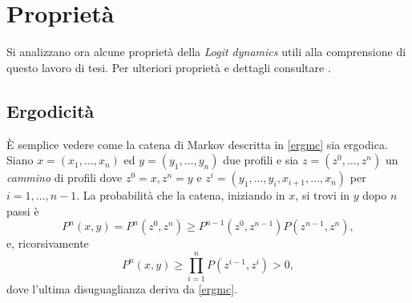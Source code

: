 \section{Proprietà}
Si analizzano ora alcune proprietà della \textit{Logit dynamics} utili alla comprensione di questo lavoro di tesi. Per ulteriori proprietà e dettagli consultare \cite{ferraioli2012logit}.
\subsection{Ergodicità} \label{ssec:ergod}
È semplice vedere come la catena di Markov descritta in \ref{ergmc} sia ergodica. Siano $x = (x_1, \dots, x_n)$ ed $y = (y_1, \dots, y_n)$ due profili e sia $z=(z^0, \dots, z^n)$ un \textit{cammino} di profili dove $z^0 = x, z^n = y$ e $z^i=(y_1, \dots, y_i, x_{i+1}, \dots, x_n)$ per $i=1, \dots, n-1$. La probabilità che la catena, iniziando in $x$, si trovi in $y$ dopo $n$ passi è
\begin{equation}
	P^n(x,y) = P^n(z^0, z^n) \geq P^{n-1}(z^0, z^{n-1})P(z^{n-1}, z^n),
\end{equation}
e, ricorsivamente
\begin{equation}
	P^n(x,y) \geq \prod_{i=1}^{n}{P(z^{i-1}, z^i)} > 0,
\end{equation}
dove l'ultima disuguaglianza deriva da \ref{ergmc}.

